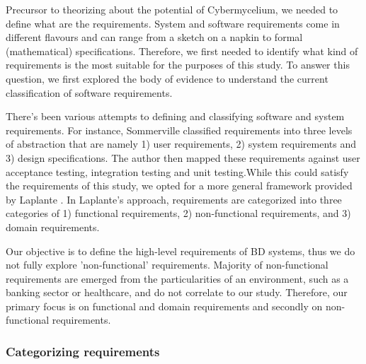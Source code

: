 \documentclass[review]{elsarticle}
\begin{document}
Precursor to theorizing about the potential of Cybermycelium, we needed to define what are the requirements. System and software requirements come in different flavours and can range from a sketch on a napkin to formal (mathematical) specifications. Therefore, we first needed to identify what kind of requirements is the most suitable for the purposes of this study. To answer this question, we first explored the body of evidence to understand the current classification of software requirements. 

There's been various attempts to defining and classifying software and system requirements. For instance, Sommerville \cite{sommerville2011software} classified requirements into three levels of abstraction that are namely 1) user requirements, 2) system requirements and 3) design specifications. The author then mapped these requirements against user acceptance testing, integration testing and unit testing.While this could satisfy the requirements of this study, we opted for a more general framework provided by Laplante \cite{laplante2017requirements}. In Laplante's approach, requirements are categorized into three categories of 1) functional requirements, 2) non-functional requirements, and 3) domain requirements. 

Our objective is to define the high-level requirements of BD systems, thus we do not fully explore 'non-functional' requirements. Majority of non-functional requirements are emerged from the particularities of an environment, such as a banking sector or healthcare, and do not correlate to our study. Therefore, our primary focus is on functional and domain requirements and secondly on non-functional requirements.

\subsubsection{Categorizing requirements} 
\end{document}

